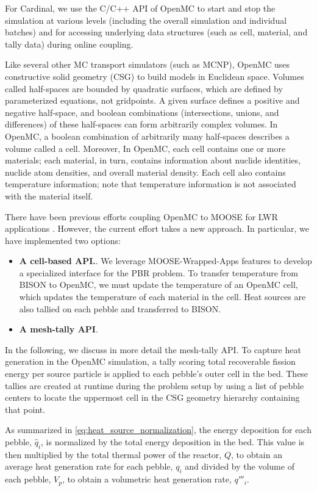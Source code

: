 For Cardinal, we use the C/C++ API of OpenMC to start and stop the simulation at various levels (including the overall
simulation and individual batches) and for accessing underlying data structures (such as cell, material, and
tally data) during online coupling.

Like several other MC transport simulators (such as MCNP), OpenMC uses constructive solid geometry (CSG) to build models in Euclidean space.
Volumes called half-spaces are bounded by quadratic surfaces, which are defined by parameterized equations, not gridpoints. A given surface defines a positive and negative half-space, and boolean combinations (intersections, unions, and differences) of these half-spaces can form arbitrarily complex volumes. In OpenMC, a boolean combination of arbitrarily many half-spaces describes a volume called a cell. Moreover, In OpenMC, each cell contains one or more materials; each material, in turn, contains information about nuclide identities, nuclide atom densities, and overall material density. Each cell also contains temperature information; note that temperature information is not associated with the material itself.

There have been previous efforts coupling OpenMC to MOOSE for LWR applications \cite{ellis2017preliminary}.
However, the current effort takes a new approach. In particular, we have implemented two options:
\begin{itemize}
    \item \textbf{A cell-based API.}.  We leverage MOOSE-Wrapped-Apps features to develop a specialized interface for the PBR problem. To transfer temperature from BISON to OpenMC, we must update the temperature of an OpenMC cell, which updates the temperature of each material in the cell. Heat sources are also tallied on each pebble and transferred to BISON.
    \item \textbf{A mesh-tally API}.
\end{itemize}

In the following, we discuss in more detail the mesh-tally API. To capture heat generation in the OpenMC simulation, a tally scoring total recoverable fission energy per source particle is applied to each pebble's outer cell in the bed. These tallies are created at runtime during the problem setup by using a list of pebble centers to locate the uppermost cell in the CSG geometry hierarchy containing that point.

As summarized in \autoref{eq:heat_source_normalization}, the energy deposition for each pebble, $\hat{q}_{i}$, is normalized by the total energy deposition in the bed.  This value is then multiplied by the total thermal power of the reactor, $Q$, to obtain an average heat generation rate for each pebble, $q_i$ and divided by the volume of each pebble, $V_p$, to obtain a volumetric heat generation rate, $q'''_i$.

